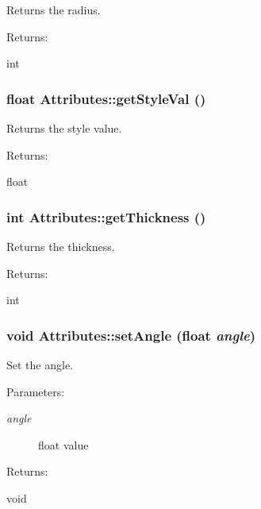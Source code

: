 Returns the radius. \begin{Desc}
\item[Returns: ]\par
int \end{Desc}
\subsubsection{\setlength{\rightskip}{0pt plus 5cm}float Attributes::get\-Style\-Val ()\hspace{0.3cm}{\tt  [inline]}}\label{classAttributes_a31}


Returns the style value. \begin{Desc}
\item[Returns: ]\par
float \end{Desc}
\subsubsection{\setlength{\rightskip}{0pt plus 5cm}int Attributes::get\-Thickness ()\hspace{0.3cm}{\tt  [inline]}}\label{classAttributes_a25}


Returns the thickness. \begin{Desc}
\item[Returns: ]\par
int \end{Desc}
\subsubsection{\setlength{\rightskip}{0pt plus 5cm}void Attributes::set\-Angle (float {\em angle})\hspace{0.3cm}{\tt  [inline]}}\label{classAttributes_a17}


Set the angle. \begin{Desc}
\item[Parameters: ]\par
\begin{description}
\item[{\em 
angle}]float value \end{description}
\end{Desc}
\begin{Desc}
\item[Returns: ]\par
void \end{Desc}


